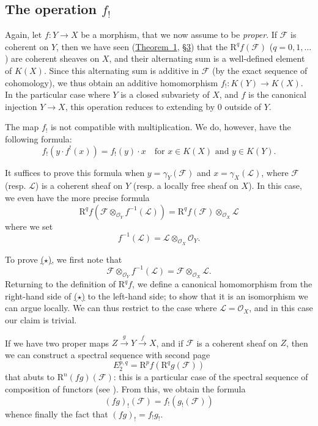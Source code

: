 \documentclass{article}
\newcommand{\scr}[1]{{\mathscr{#1}}}
\newcommand{\RR}{\mathrm{R}}
\newcommand{\oldpage}[1]{\marginpar{\footnotesize$\Big\vert$ \textit{p.~#1}}}
\begin{document}
\subsection{The operation \texorpdfstring{$f_!$}{f!}}
\label{subsection5d}

Again, let $f\colon Y\to X$ be a morphism, that we now assume to be \emph{proper}.
If $\scr{F}$ is coherent on $Y$, then we have seen (\hyperref[theorem1]{Theorem~1}, \hyperref[section3]{\S3}) that the $\RR^qf(\scr{F})$ ($q=0,1,\ldots$) are coherent sheaves on $X$, and their alternating sum is a well-defined element of $K(X)$.
Since this alternating sum is additive in $\scr{F}$ (by the exact sequence of cohomology), we thus obtain an additive homomorphism $f_!\colon K(Y)\to K(X)$.
In the particular case where $Y$ is a closed subvariety of $X$, and $f$ is the canonical injection $Y\to X$, this operation reduces to extending by $0$ outside of $Y$.

The map $f_!$ is not compatible with multiplication.
We do, however, have the following formula:
\[
  f_!(y\cdot f^!(x)) = f_!(y)\cdot x
  \quad
  \mbox{for $x\in K(X)$ and $y\in K(Y)$.}
\]

It suffices to prove this formula when $y=\gamma_Y(\scr{F})$ and $x=\gamma_X(\scr{L})$, where $\scr{F}$ (resp. $\scr{L}$) is a coherent sheaf on $Y$ (resp. a locally free sheaf on $X$).
In this case, we even have the more precise formula
\[
\label{equation*}
  \RR^qf(\scr{F}\otimes_{\scr{O}_Y}f^{-1}(\scr{L})) = \RR^qf(\scr{F})\otimes_{\scr{O}_X}\scr{L}
  \tag{$\star$}
\]
where we set
\[
  f^{-1}(\scr{L}) = \scr{L}\otimes_{\scr{O}_X}\scr{O}_Y.
\]

\oldpage{111}
To prove \hyperref[equation*]{($\star$)}, we first note that
\[
  \scr{F}\otimes_{\scr{O}_Y}f^{-1}(\scr{L}) = \scr{F}\otimes_{\scr{O}_X}\scr{L}.
\]
Returning to the definition of $\RR^qf$, we define a canonical homomorphism from the right-hand side of \hyperref[equation*]{($\star$)} to the left-hand side;
to show that it is an isomorphism we can argue locally.
We can thus restrict to the case where $\scr{L}=\scr{O}_X$, and in this case our claim is trivial.

If we have two proper maps $Z\xrightarrow{g}Y\xrightarrow{f}X$, and if $\scr{F}$ is a coherent sheaf on $Z$, then we can construct a spectral sequence with second page
\[
  E_2^{p,q} = \RR^pf(\RR^qg(\scr{F}))
\]
that abuts to $\RR^n(fg)(\scr{F})$:
this is a particular case of the spectral sequence of composition of functors (see \cite{7}).
From this, we obtain the formula
\[
  (fg)_!(\scr{F}) = f_!(g_!(\scr{F}))
\]
whence finally the fact that $(fg)_!=f_!g_!$.
\end{document}
